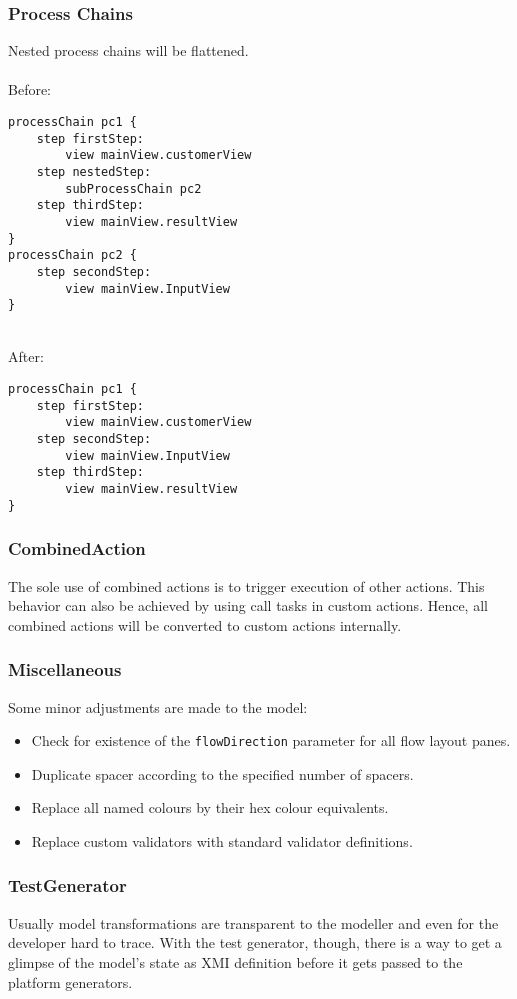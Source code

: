 \subsubsection{Process Chains}
Nested process chains will be flattened. \\ \\
Before:
\begin{lstlisting}[language=MD2]
processChain pc1 {
	step firstStep:
		view mainView.customerView
	step nestedStep:
		subProcessChain pc2
	step thirdStep:
		view mainView.resultView
}
processChain pc2 {
	step secondStep:
		view mainView.InputView
}
\end{lstlisting}
~
\\
After:
\begin{lstlisting}[language=MD2]
processChain pc1 {
	step firstStep:
		view mainView.customerView
	step secondStep:
		view mainView.InputView
	step thirdStep:
		view mainView.resultView
}

\end{lstlisting}

\subsubsection{CombinedAction}
The sole use of combined actions is to trigger execution of other actions. This behavior can also be achieved by using call tasks in custom actions. Hence, all combined actions will be converted to custom actions internally.

\subsubsection{Miscellaneous}
Some minor adjustments are made to the model:

\begin{itemize}
\item Check for existence of the \lstinline!flowDirection! parameter for all flow layout panes.
\item Duplicate spacer according to the specified number of spacers.
\item Replace all named colours by their hex colour equivalents.
\item Replace custom validators with standard validator definitions.
\end{itemize}

\subsubsection{TestGenerator}
Usually model transformations are transparent to the modeller and even for the developer hard to trace. With the test generator, though, there is a way to get a glimpse of the model's state as XMI definition before it gets passed to the platform generators.
